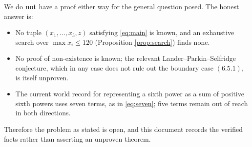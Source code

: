 \documentclass{amsart}
\begin{document}
We do \textbf{not} have a proof either way for the general question
posed. The honest answer is:
\begin{itemize}
\item No tuple $(x_1,\dots,x_5,z)$ satisfying \eqref{eq:main} is known,
      and an exhaustive search over $\max x_i\le 120$ (Proposition
      \ref{prop:search}) finds none.
\item No proof of non-existence is known; the relevant
      Lander--Parkin--Selfridge conjecture, which in any case does not
      rule out the boundary case $(6.5.1)$, is itself unproven.
\item The current world record for representing a sixth power as a sum
      of positive sixth powers uses seven terms, as in \eqref{eq:seven};
      five terms remain out of reach in both directions.
\end{itemize}

Therefore the problem as stated is open, and this document records the
verified facts rather than asserting an unproven theorem.
\end{document}
